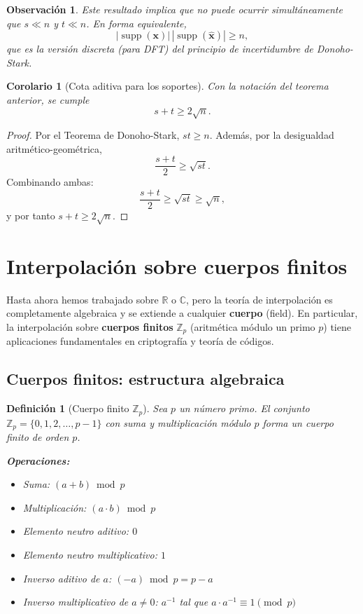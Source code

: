 \documentclass[a4paper,11pt]{report}
\newtheorem{corollary}[theorem]{Corolario}
\newtheorem{definition}[theorem]{Definición}
\newtheorem{remark}[theorem]{Observación}
\begin{document}
\begin{remark}
Este resultado implica que no puede ocurrir simultáneamente que $s\ll n$ y $t\ll n$. En forma equivalente,
\[
|\operatorname{supp}(\mathbf{x})|\,|\operatorname{supp}(\widehat{\mathbf{x}})|\ge n,
\]
que es la versión discreta (para DFT) del principio de incertidumbre de Donoho-Stark.
\end{remark}

\begin{corollary}[Cota aditiva para los soportes]
Con la notación del teorema anterior, se cumple
\[
s+t\ge 2\sqrt{n}.
\]
\end{corollary}

\begin{proof}
Por el Teorema de Donoho-Stark, $st\ge n$. Además, por la desigualdad aritmético-geométrica,
\[
\frac{s+t}{2}\ge \sqrt{st}.
\]
Combinando ambas:
\[
\frac{s+t}{2}\ge \sqrt{st}\ge \sqrt{n},
\]
y por tanto $s+t\ge 2\sqrt{n}$.
\end{proof}




\section{Interpolación sobre cuerpos finitos}

Hasta ahora hemos trabajado sobre $\mathbb{R}$ o $\mathbb{C}$, pero la teoría de interpolación es completamente algebraica y se extiende a cualquier \textbf{cuerpo} (field). En particular, la interpolación sobre \textbf{cuerpos finitos} $\mathbb{Z}_p$ (aritmética módulo un primo $p$) tiene aplicaciones fundamentales en criptografía y teoría de códigos.

\subsection{Cuerpos finitos: estructura algebraica}

\begin{definition}[Cuerpo finito $\mathbb{Z}_p$]
Sea $p$ un número primo. El conjunto $\mathbb{Z}_p = \{0, 1, 2, \ldots, p-1\}$ con suma y multiplicación módulo $p$ forma un cuerpo finito de orden $p$.

\textbf{Operaciones:}
\begin{itemize}
\item Suma: $(a + b) \bmod p$
\item Multiplicación: $(a \cdot b) \bmod p$
\item Elemento neutro aditivo: $0$
\item Elemento neutro multiplicativo: $1$
\item Inverso aditivo de $a$: $(-a) \bmod p = p - a$
\item Inverso multiplicativo de $a \neq 0$: $a^{-1}$ tal que $a \cdot a^{-1} \equiv 1 \pmod{p}$
\end{itemize}
\end{definition}
\end{document}
